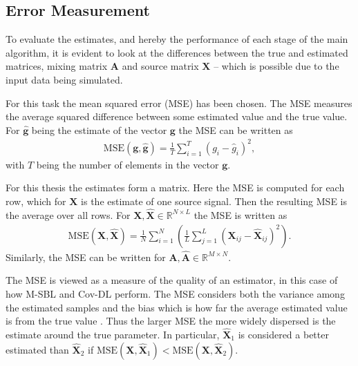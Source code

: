 \subsection{Error Measurement}\label{sec:mse}  
To evaluate the estimates, and hereby the performance of each stage of the main algorithm, it is evident to look at the differences between the true and estimated matrices, mixing matrix $\mathbf{A}$ and source matrix $\mathbf{X}$ -- which is possible due to the input data being simulated. 

For this task the mean squared error (MSE) has been chosen. 
The MSE measures the average squared difference between some estimated value and the true value. 
For $\hat{\mathbf{g}}$ being the estimate of the vector $\mathbf{g}$ the MSE can be written as 
\begin{align*}
\text{MSE}(\mathbf{g},\hat{\mathbf{g}}) = \frac{1}{T} \sum_{i=1}^T (g_i - \hat{g}_i)^2, 
\end{align*}
with $T$ being the number of elements in the vector $\mathbf{g}$. 

For this thesis the estimates form a matrix. 
Here the MSE is computed for each row, which for $\mathbf{X}$ is the estimate of one source signal. 
Then the resulting MSE is the average over all rows. 
For $\mathbf{X}, \hat{\mathbf{X}} \in \mathbb{R}^{N \times L}$ the MSE is written as 
\begin{align*}
\text{MSE}(\mathbf{X},\hat{\mathbf{X}}) = \frac{1}{N} \sum_{i=1}^{N} \left( \frac{1}{L} \sum_{j=1}^L (\mathbf{X}_{ij} - \hat{\mathbf{X}}_{ij})^2\right).  
\end{align*}
Similarly, the MSE can be written for $\mathbf{A},\hat{\mathbf{A}} \in \mathbb{R}^{M \times N}$.  

The MSE is viewed as a measure of the quality of an estimator, in this case of how M-SBL and Cov-DL perform. 
The MSE considers both the variance among the estimated samples and the bias which is how far the average estimated value is from the true value \cite[p.305]{MSE_book}.  
Thus the larger MSE the more widely dispersed is the estimate around the true parameter.
In particular, $\hat{\mathbf{X}}_1$ is considered  a better estimated than $\hat{\mathbf{X}}_2$ if $\text{MSE}(\mathbf{X},\hat{\mathbf{X}}_1)< \text{MSE}(\mathbf{X},\hat{\mathbf{X}}_2)$. 

